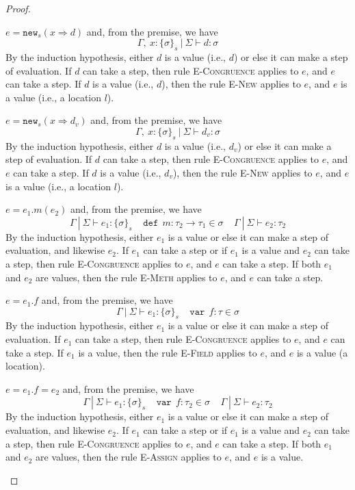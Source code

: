\documentclass{llncs}
\newcommand{\keywadj}[1]{\mathtt{#1}}
\newcommand{\keyw}[1]{\keywadj{#1}~}
\newcommand{\pcase}[1][]{
  \if\relax\detokenize{#1}\relax
    \def\thiscase{}
  \else
    \def\thiscase{~#1}
  \fi
  \item
}
\begin{document}
\begin{proof}
\begin{pcases}
\pcase[\textsc{T-New-1}]
$e = \keywadj{new}_{s}(x \Rightarrow d)$ and, from the premise, we have
\[
\Gamma,~x : \{ \sigma \}_{s}~|~\Sigma \vdash d : \sigma
\]
By the induction hypothesis, either $d$ is a value (i.e., $d$) or else it can make a step of evaluation. If $d$ can take a step, then rule \textsc{E-Congruence} applies to $e$, and $e$ can take a step. If $d$ is a value (i.e., $d$), then the rule \textsc{E-New} applies to $e$, and $e$ is a value (i.e., a location $l$).
\\
\pcase[\textsc{T-New-2}]
$e = \keywadj{new}_{s}(x \Rightarrow d_v)$ and, from the premise, we have
\[
\Gamma,~x : \{ \sigma \}_{s}~|~\Sigma \vdash d_v : \sigma
\]
By the induction hypothesis, either $d$ is a value (i.e., $d_v$) or else it can make a step of evaluation. If $d$ can take a step, then rule \textsc{E-Congruence} applies to $e$, and $e$ can take a step. If $d$ is a value (i.e., $d_v$), then the rule \textsc{E-New} applies to $e$, and $e$ is a value (i.e., a location $l$).
\\
\pcase[\textsc{T-Meth}]
$e = e_1.m(e_2)$ and, from the premise, we have
\[
\Gamma~|~\Sigma \vdash e_1 : \{\sigma\}_s~~~~~\keyw{def}~ m : \tau_2 \rightarrow \tau_1 \in \sigma~~~~~\Gamma~|~\Sigma \vdash e_2 : \tau_2
\]
By the induction hypothesis, either $e_1$ is a value or else it can make a step of evaluation, and likewise $e_2$. If $e_1$ can take a step or if $e_1$ is a value and $e_2$ can take a step, then rule \textsc{E-Congruence} applies to $e$, and $e$ can take a step. If both $e_1$ and $e_2$ are values, then the rule \textsc{E-Meth} applies to $e$, and $e$ can take a step.
\\
\pcase[\textsc{T-Field}]
$e = e_1.f$ and, from the premise, we have
\[
\Gamma~|~\Sigma \vdash e_1 : \{\sigma\}_s~~~~~\keyw{var}~ f : \tau \in \sigma
\]
By the induction hypothesis, either $e_1$ is a value or else it can make a step of evaluation. If $e_1$ can take a step, then rule \textsc{E-Congruence} applies to $e$, and $e$ can take a step. If $e_1$ is a value, then the rule \textsc{E-Field} applies to $e$, and $e$ is a value (a location).
\\
\pcase[\textsc{T-Assign}]
$e = e_1.f=e_2$ and, from the premise, we have
\[
\Gamma~|~\Sigma \vdash e_1 : \{\sigma\}_s~~~~~\keyw{var}~ f:\tau_2 \in \sigma~~~~~\Gamma~|~\Sigma \vdash e_2 : \tau_2
\]
By the induction hypothesis, either $e_1$ is a value or else it can make a step of evaluation, and likewise $e_2$. If $e_1$ can take a step or if $e_1$ is a value and $e_2$ can take a step, then rule \textsc{E-Congruence} applies to $e$, and $e$ can take a step. If both $e_1$ and $e_2$ are values, then the rule \textsc{E-Assign} applies to $e$, and $e$ is a value.

\end{pcases}
\end{proof}
\end{document}
